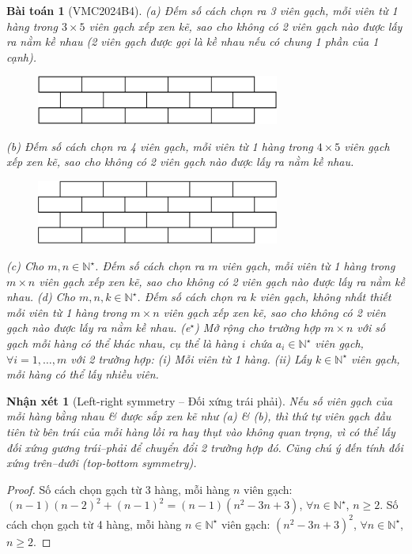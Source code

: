 \documentclass[oneside]{book}
\newtheorem{baitoan}{Bài toán}
\newtheorem{nhanxet}{Nhận xét}
\begin{document}
\begin{baitoan}[VMC2024B4]
	(a) Đếm số cách chọn ra 3 viên gạch, mỗi viên từ 1 hàng trong $3\times5$ viên gạch xếp xen kẽ, sao cho không có 2 viên gạch nào được lấy ra nằm kề nhau (2 viên gạch được gọi là kề nhau nếu có chung 1 phần của 1 cạnh).
	\begin{figure}[H]
		\centering
		\includegraphics[width=8cm]{brick3x5}
	\end{figure}
	(b) Đếm số cách chọn ra 4 viên gạch, mỗi viên từ 1 hàng trong $4\times5$ viên gạch xếp xen kẽ, sao cho không có 2 viên gạch nào được lấy ra nằm kề nhau.
	\begin{figure}[H]
		\centering
		\includegraphics[width=8cm]{brick4x5}
	\end{figure}
	(c) Cho $m,n\in\mathbb{N}^\star$. Đếm số cách chọn ra $m$ viên gạch, mỗi viên từ 1 hàng trong $m\times n$ viên gạch xếp xen kẽ, sao cho không có 2 viên gạch nào được lấy ra nằm kề nhau. (d) Cho $m,n,k\in\mathbb{N}^\star$. Đếm số cách chọn ra $k$ viên gạch, không nhất thiết mỗi viên từ 1 hàng trong $m\times n$ viên gạch xếp xen kẽ, sao cho không có 2 viên gạch nào được lấy ra nằm kề nhau. (e${}^\star$) Mở rộng cho trường hợp $m\times n$ với số gạch mỗi hàng có thể khác nhau, cụ thể là hàng $i$ chứa $a_i\in\mathbb{N}^\star$ viên gạch, $\forall i = 1,\ldots,m$ với 2 trường hợp: (i) Mỗi viên từ 1 hàng. (ii) Lấy $k\in\mathbb{N}^\star$ viên gạch, mỗi hàng có thể lấy nhiều viên.
\end{baitoan}

\begin{nhanxet}[Left-right symmetry -- Đối xứng trái phải]
	Nếu số viên gạch của mỗi hàng bằng nhau \& được sắp xen kẽ như (a) \& (b), thì thứ tự viên gạch đầu tiên từ bên trái của mỗi hàng lồi ra hay thụt vào không quan trọng, vì có thể lấy đối xứng gương trái--phải để chuyển đổi 2 trường hợp đó. Cũng chú ý đến tính đối xứng trên--dưới (top-bottom symmetry).
\end{nhanxet}

\begin{proof}
	Số cách chọn gạch từ 3 hàng, mỗi hàng $n$ viên gạch: $(n - 1)(n - 2)^2 + (n - 1)^2 = (n - 1)(n^2 - 3n + 3)$, $\forall n\in\mathbb{N}^\star$, $n\ge2$. Số cách chọn gạch từ 4 hàng, mỗi hàng $n\in\mathbb{N}^\star$ viên gạch: $(n^2 - 3n + 3)^2$, $\forall n\in\mathbb{N}^\star$, $n\ge2$.
\end{proof}
\end{document}
